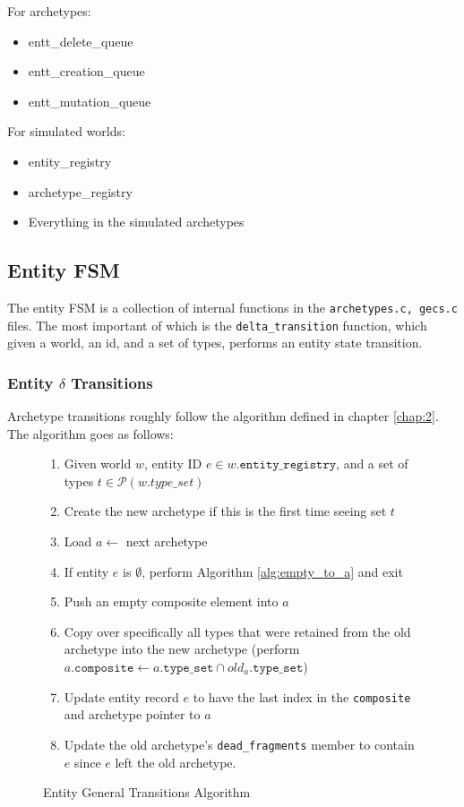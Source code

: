 For archetypes:
\begin{itemize}
    \item entt\_delete\_queue
    \item entt\_creation\_queue
    \item entt\_mutation\_queue
\end{itemize}

For simulated worlds:
\begin{itemize}
    \item entity\_registry
    \item archetype\_registry
    \item Everything in the simulated archetypes
\end{itemize}

\subsection{Entity FSM}
The entity FSM is a collection of internal functions in the \texttt{archetypes.c, gecs.c} files. The most important of which is the \texttt{delta\_transition} function, which given a world, an id, and a set of types, performs an entity state transition.

\subsubsection{Entity $\delta$ Transitions}
Archetype transitions roughly follow the algorithm defined in chapter \ref{chap:2}. The algorithm goes as follows:

\begin{figure}[htbp]
    \begin{enumerate}
        \item Given world $w$, entity ID $e \in w.\texttt{entity\_registry}$, and a set of types $t \in \mathcal{P}(w.type\_set)$
        \item Create the new archetype if this is the first time seeing set $t$
        \item Load $a \leftarrow$ next archetype
        \item If entity $e$ is $\emptyset$, perform Algorithm \ref{alg:empty_to_a} and exit
        \item Push an empty composite element into $a$
        \item Copy over specifically all types that were retained from the old archetype into the new archetype (perform $a.\texttt{composite} \leftarrow a.\texttt{type\_set} \cap old_a.\texttt{type\_set}$)
        \item Update entity record $e$ to have the last index in the \texttt{composite} and archetype pointer to $a$
        \item Update the old archetype's \texttt{dead\_fragments} member to contain $e$ since $e$ left the old archetype.
    \end{enumerate} 
    \caption{Entity General Transitions Algorithm}
    \label{alg:transition}
\end{figure}

